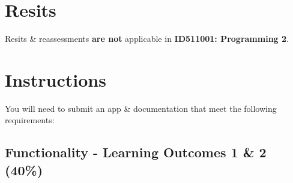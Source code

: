 \documentclass{article}
\begin{document}
\section*{Resits}
Resits \& reassessments \textbf{are not} applicable in \textbf{ID511001: Programming 2}.

\section*{Instructions}
You will need to submit an app \& documentation that meet the following requirements:\\

\subsection*{Functionality - Learning Outcomes 1 \& 2 (40\%)}
\end{document}
